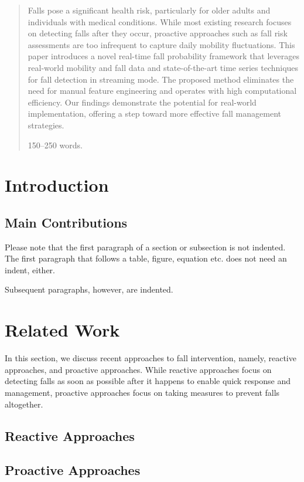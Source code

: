 \documentclass[runningheads]{llncs}
\begin{document}
\begin{abstract}
Falls pose a significant health risk, particularly for older adults and individuals with medical conditions. While most existing research focuses on detecting falls after they occur, proactive approaches such as fall risk assessments are too infrequent to capture daily mobility fluctuations. This paper introduces a novel real-time fall probability framework that leverages real-world mobility and fall data and state-of-the-art time series techniques for fall detection in streaming mode. The proposed method eliminates the need for manual feature engineering and operates with high computational efficiency. Our findings demonstrate the potential for real-world implementation, offering a step toward more effective fall management strategies.

150--250 words.

\end{abstract}

\section{Introduction}
\subsection{Main Contributions}
Please note that the first paragraph of a section or subsection is
not indented. The first paragraph that follows a table, figure,
equation etc. does not need an indent, either.

Subsequent paragraphs, however, are indented.

\section{Related Work}
In this section, we discuss recent approaches to fall intervention, namely, reactive approaches, and proactive approaches. While reactive approaches focus on detecting falls as soon as possible after it happens to enable quick response and management, proactive approaches focus on taking measures to prevent falls altogether.
\subsection{Reactive Approaches}
\subsection{Proactive Approaches}
\end{document}
